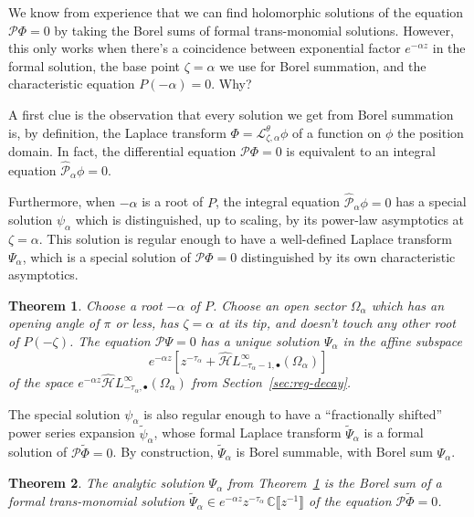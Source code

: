 \documentclass{article}
\newcommand{\dualsingexp}[2]{\widehat{\mathcal{H}}L^\infty_{#1, #2}}
\newcommand{\dualsingexpalg}[1]{\dualsingexp{#1}{\bullet}}
\newcommand{\C}{\mathbb{C}}
\newcommand{\series}[1]{\tilde{#1}}
\newcommand{\laplace}{\mathcal{L}}
\theoremstyle{definition}
\theoremstyle{plain}
\newtheorem{theorem}{Theorem}[section]
\begin{document}
We know from experience that we can find holomorphic solutions of the equation $\mathcal{P}\Phi = 0$ by taking the Borel sums of formal trans-monomial solutions. However, this only works when there's a coincidence between exponential factor $e^{-\alpha z}$ in the formal solution, the base point $\zeta = \alpha$ we use for Borel summation, and the characteristic equation $P(-\alpha) = 0$. Why?

A first clue is the observation that every solution we get from Borel summation is, by definition, the Laplace transform $\Phi = \laplace_{\zeta,\alpha}^\theta \phi$ of a function on $\phi$ the position domain. In fact, the differential equation $\mathcal{P}\Phi = 0$ is equivalent to an integral equation $\hat{\mathcal{P}}_\alpha \phi = 0$.

Furthermore, when $-\alpha$ is a root of $P$, the integral equation $\hat{\mathcal{P}}_\alpha \phi = 0$ has a special solution $\psi_\alpha$ which is distinguished, up to scaling, by its power-law asymptotics at $\zeta = \alpha$. This solution is regular enough to have a well-defined Laplace transform $\Psi_\alpha$, which is a special solution of $\mathcal{P}\Phi = 0$ distinguished by its own characteristic asymptotics.
\color{BlueViolet}
\begin{theorem}\label{thm:exist_uniq_ODE}
Choose a root $-\alpha$ of $P$. Choose an open sector $\Omega_\alpha$ which has an opening angle of $\pi$ or less, has $\zeta = \alpha$ at its tip, and doesn't touch any other root of $P(-\zeta)$. The equation $\mathcal{P}\Psi = 0$ has a unique solution $\Psi_\alpha$ in the affine subspace
\[ e^{-\alpha z} \left[ z^{-\tau_\alpha} + \dualsingexpalg{-\tau_\alpha-1}(\Omega_\alpha) \right] \]
of the space $e^{-\alpha z} \dualsingexpalg{-\tau_\alpha}(\Omega_\alpha)$ from Section~\ref{sec:reg-decay}.
\end{theorem}
The special solution $\psi_\alpha$ is also regular enough to have a ``fractionally shifted'' power series expansion $\series{\psi}_\alpha$, whose formal Laplace transform $\series{\Psi}_\alpha$ is a formal solution of $\mathcal{P}\series{\Phi} = 0$. By construction, $\series{\Psi}_\alpha$ is Borel summable, with Borel sum $\Psi_\alpha$.
\begin{theorem}\label{thm:is_Borel_sum}
The analytic solution $\Psi_\alpha$ from Theorem~\ref{thm:exist_uniq_ODE} is the Borel sum of a formal trans-monomial solution $\series{\Psi}_\alpha \in e^{-\alpha z} z^{-\tau_\alpha}\,\C \llbracket z^{-1} \rrbracket$ of the equation $\mathcal{P}\series{\Phi} = 0$.
\end{theorem}
\end{document}
